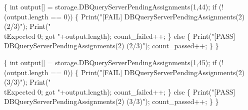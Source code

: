 \documentclass{article}
\def\nwendcode{\endtrivlist \endgroup}
\let\nwdocspar=\par
\theoremstyle{definition}
\begin{document}
\{
  int output[] = storage.DBQueryServerPendingAssignments(1,44);
  if (!(output.length == 0)) \{
    Print("[FAIL] DBQueryServerPendingAssignments(2) (2/3)");
    Print("\\tExpected 0; got "+output.length);
    count_failed++;
  \} else \{
    Print("[PASS] DBQueryServerPendingAssignments(2) (2/3)");
    count_passed++;
  \}
\}
\nwendcode{}\nwdocspar
\nwenddocs{}\endmoddef{}
\{
  int output[] = storage.DBQueryServerPendingAssignments(1,45);
  if (!(output.length == 0)) \{
    Print("[FAIL] DBQueryServerPendingAssignments(2) (3/3)");
    Print("\\tExpected 0; got "+output.length);
    count_failed++;
  \} else \{
    Print("[PASS] DBQueryServerPendingAssignments(2) (3/3)");
    count_passed++;
  \}
\}
\nwendcode{}\nwdocspar
\end{document}
